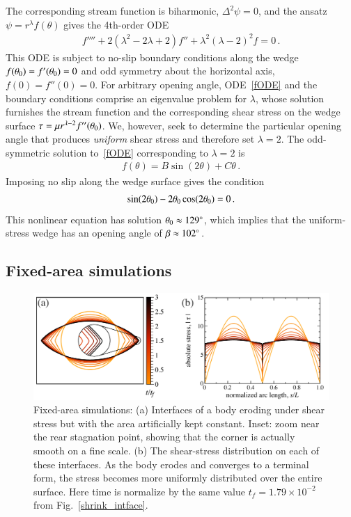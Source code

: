 \documentclass[preprint, 10pt]{elsarticle}
\begin{document}
The corresponding stream function is biharmonic, $\Delta^2 \psi = 0$, and the ansatz $\psi = r^{\lambda}f(\theta)$ gives the 4th-order ODE~\cite{poz1997}
\begin{align}
\label{fODE}
f'''' + 2(\lambda^2 - 2 \lambda + 2)f'' + \lambda^2(\lambda-2)^2 f = 0 \, .
\end{align}
This ODE is subject to no-slip boundary conditions along the wedge $f(\theta_0) = f'(\theta_0) = 0$ and odd symmetry about the horizontal axis, $f(0) = f''(0) = 0$. For arbitrary opening angle, ODE~\eqref{fODE} and the boundary conditions comprise an eigenvalue problem for $\lambda$, whose solution furnishes the stream function and the corresponding shear stress on the wedge surface $\tau = \mu r^{\lambda-2} f''(\theta_0)$. We, however, seek to determine the particular opening angle that produces {\em uniform} shear stress and therefore set $\lambda = 2$.  The odd-symmetric solution to~\eqref{fODE} corresponding to $\lambda=2$ is
\begin{align}
  f(\theta) = B \sin (2 \theta) + C \theta \, .
\end{align}
Imposing no slip along the wedge surface gives the condition
\begin{align}
  \sin(2 \theta_0) - 2 \theta_0 \cos(2 \theta_0) = 0 \, .
\end{align}
This nonlinear equation has solution $\theta_0 \approx 129^\circ$, which implies that the uniform-stress wedge has an opening angle of $\beta \approx 102^\circ$.


\subsection{Fixed-area simulations}

\begin{figure}%
\begin{center}
\includegraphics[width = 0.85 \textwidth]{./figs/fixed_intface.pdf}
\caption{Fixed-area simulations: (a) Interfaces of a body eroding under shear stress but with the area artificially kept constant. Inset: zoom near the rear stagnation point, showing that the corner is actually smooth on a fine scale. (b) The shear-stress distribution on each of these interfaces. As the body erodes and converges to a terminal form, the stress becomes more uniformly distributed over the entire surface. Here time is normalize by the same value $t_f = 1.79 \times 10^{-2}$ from Fig.~\ref{shrink_intface}.}
\label{fixed_intface}
\end{center}
\end{figure}
\end{document}
